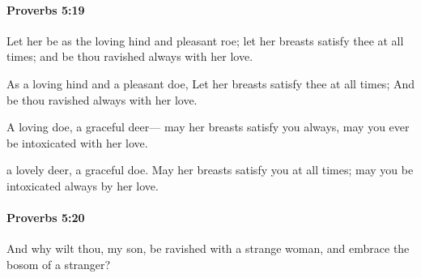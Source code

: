 		\paragraph{Proverbs 5:19} %
			\label{PROVERBS-5-19}

			Let her be as the loving hind and pleasant roe; let her breasts satisfy thee at all times; and be thou ravished always with her love.

			\begin{versebox}
					\item[BHS] 
					\item[ASV] As a loving hind and a pleasant doe, Let her breasts satisfy thee at all times; And be thou ravished always with her love.
					\item[NIV] A loving doe, a graceful deer— may her breasts satisfy you always, may you ever be intoxicated with her love.
					\item[NRSV] a lovely deer, a graceful doe. May her breasts satisfy you at all times; may you be intoxicated always by her love.
			\end{versebox}

		\paragraph{Proverbs 5:20} %
			\label{PROVERBS-5-20}

			And why wilt thou, my son, be ravished with a strange woman, and embrace the bosom of a stranger?

